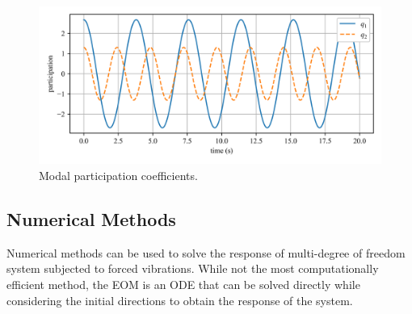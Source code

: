 \documentclass[12pt,letter]{article}
\begin{document}
\begin{example}
	\begin{figure}[H]
		\centering
		\includegraphics[width=\linewidth]{../figures/modal_analysis_free_participation_factors.png}
		\caption{Modal participation coefficients.}
		\label{fig:modal_analysis_free_participation_factors}
	\end{figure}
	
	
	
	\end{example}
	
		\subsection{Numerical Methods}
		
			Numerical methods can be used to solve the response of multi-degree of freedom system subjected to forced vibrations. While not the most computationally efficient method, the EOM is an ODE that can be solved directly while considering the initial directions to obtain the response of the system. 
			

			
\end{document}
